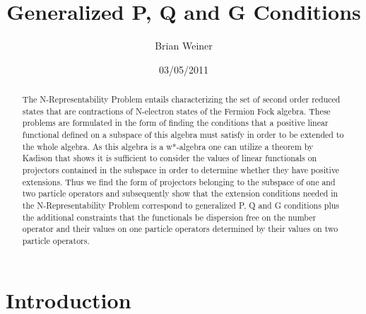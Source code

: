 \documentclass[aps,preprint,amsfonts,amssymb,showpacs,showkeys]{revtex4}%
\begin{document}
\preprint{ }
\title[P, Q and G Conditions]{Generalized P, Q and G Conditions}
\author{Brian Weiner}

\begin{abstract}
The N-Representability Problem entails characterizing the set of second order
reduced states that are contractions of N-electron states of the Fermion Fock
algebra. These problems are formulated in the form of finding the conditions
that a positive linear functional defined on a subspace of this algebra must
satisfy in order to be extended to the whole algebra. As this algebra is a
w*-algebra one can utilize a theorem by Kadison that shows it is sufficient to
consider the values of linear functionals on projectors contained in the
subspace in order to determine whether they have positive extensions. Thus we
find the form of projectors belonging to the subspace of one and two particle
operators and subsequently show that the extension conditions needed in the
N-Representability Problem correspond to generalized P, Q and G conditions
plus the additional constraints that the functionals be dispersion free on the
number operator and their values on one particle operators determined by their
values on two particle operators.

\end{abstract}
\date{03/05/2011}
\maketitle
\tableofcontents


\section{Introduction \label{Intro}}
\end{document}
